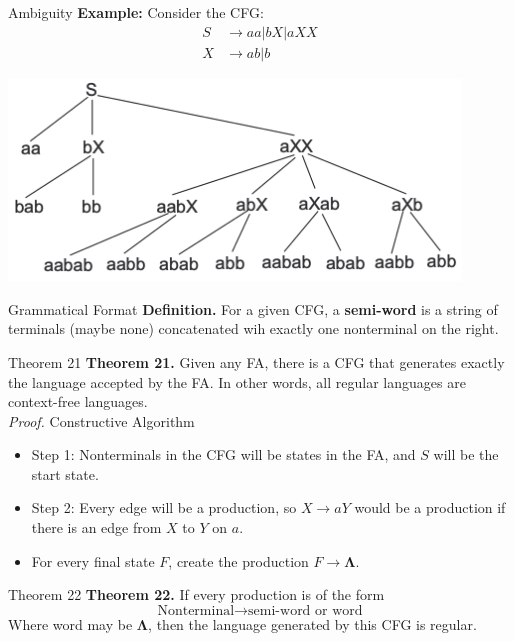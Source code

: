 \documentclass{article}
\begin{document}
\begin{multicols*}{3}
\begin{blackbox}{Ambiguity}
    \textbf{Example:} Consider the CFG: 
    \begin{align*}
        S &\rightarrow aa | bX | aXX\\
        X &\rightarrow ab|b
    \end{align*}
    \begin{center}
        \includegraphics[width=0.9\textwidth]{total_tree.png}
    \end{center}
\end{blackbox}
\begin{blackbox}{Grammatical Format}
    \textbf{Definition.} For a given CFG, a \textbf{semi-word} is a string of terminals (maybe none) concatenated wih exactly one nonterminal on the right.
    \begin{bluebox}{Theorem 21}
        \textbf{Theorem 21.} Given any FA, there is a CFG that generates exactly the language accepted by the FA. In other words, all regular languages are context-free languages.\\[1ex]
        \textit{Proof.} Constructive Algorithm
        \begin{itemize}[leftmargin=5pt]
            \item Step 1: Nonterminals in the CFG will be states in the FA, and $S$ will be the start state.
            \item Step 2: Every edge will be a production, so $X \rightarrow aY$ would be a production if there is an edge from $X$ to $Y$ on $a$.
            \item For every final state $F$, create the production $F \rightarrow \boldsymbol{\Lambda}$.
        \end{itemize}
    \end{bluebox}
    \begin{redbox}{Theorem 22}
        \textbf{Theorem 22.} If every production is of the form 
        \[\text{Nonterminal} \rightarrow \text{semi-word or word} \]
        Where word may be $\boldsymbol{\Lambda}$, then the language generated by this CFG is regular.

\end{redbox}
\end{blackbox}
\end{multicols*}
\end{document}
